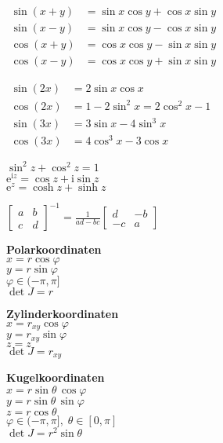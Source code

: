 \documentclass[a4paper,10pt,fleqn,twocolumn,twoside,openany]{scrbook}
\numberwithin{equation}{chapter}
\newcommand{\strong}[1]{{\sffamily\bfseries #1}}
\theoremstyle{Definition}
\theoremstyle{SatzBox}
\newcommand{\ui}{\mathrm i}
\newcommand{\ee}{\mathrm e}
\begin{document}
\noindent
$\!\begin{aligned}
\sin(x+y) &= \sin x\cos y + \cos x\sin y\\
\sin(x-y) &= \sin x\cos y - \cos x\sin y\\
\cos(x+y) &= \cos x\cos y - \sin x\sin y\\
\cos(x-y) &= \cos x\cos y + \sin x\sin y
\end{aligned}$
\vspace{1em}

\noindent
$\begin{aligned}
\sin(2x) &= 2\sin x\cos x\\
\cos(2x) &= 1-2\sin^2 x = 2\cos^2 x-1\\
\sin(3x) &= 3\sin x-4\sin^3 x\\
\cos(3x) &= 4\cos^3 x-3\cos x
\end{aligned}$
\vspace{1em}

\noindent
$\sin^2 z+\cos^2 z = 1$\\
$\ee^{\ui z}=\cos z+\ui\sin z$\\
$\ee^z = \cosh z+\sinh z$
\vspace{1em}

\noindent
$\displaystyle \begin{bmatrix}a & b\\ c & d\end{bmatrix}^{-1}
= \frac{1}{ad-bc}\begin{bmatrix}d & -b\\ -c & a\end{bmatrix}$
\vspace{2em}

\noindent
\strong{Polarkoordinaten}\\
$x=r\cos\varphi$\\
$y=r\sin\varphi$\\
$\varphi\in(-\pi,\pi]$\\
$\det J=r$
\vspace{1em}

\noindent
\strong{Zylinderkoordinaten}\\
$x=r_{xy}\cos\varphi$\\
$y=r_{xy}\sin\varphi$\\
$z=z$\\
$\det J=r_{xy}$
\vspace{1em}

\noindent
\strong{Kugelkoordinaten}\\
$x=r\sin\theta\,\cos\varphi$\\
$y=r\sin\theta\,\sin\varphi$\\
$z=r\cos\theta$\\
$\varphi\in(-\pi,\pi],\;\theta\in[0,\pi]$\\
$\det J=r^2\sin\theta$
\vspace{1em}
\end{document}

